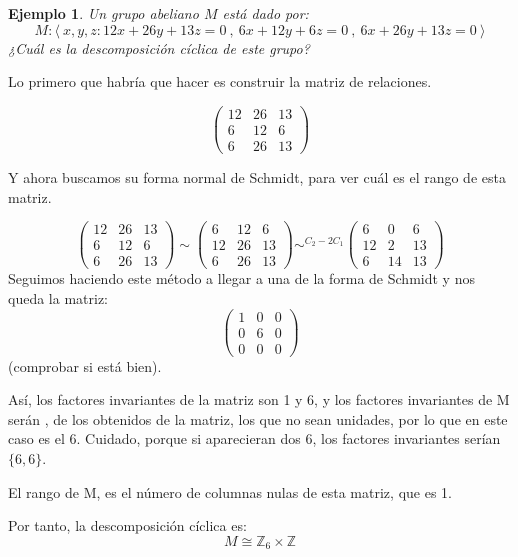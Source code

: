 \documentclass[11pt, a4paper, titlepage]{article}
\makeatletter
\newif\IfInSansMode
\let\oldsf\sffamily
\renewcommand*{\sffamily}{\oldsf\mathversion{sans}\InSansModetrue}
\let\oldnorm\normalfont
\renewcommand*{\normalfont}{\oldnorm\InSansModefalse\mathversion{normal}}
\renewenvironment{proof}[1][\proofname] {\vspace{-15pt}\par\pushQED{\qed}\normalfont\topsep6\p@\@plus6\p@\relax\trivlist\item[\hskip\labelsep\it#1\@addpunct{.}]\ignorespaces}{\popQED\endtrivlist\@endpefalse}
\providecommand{\ent}{\mathbb{Z}}
\renewenvironment{proof}[1][\proofname] {\par\pushQED{\qed}\normalfont\topsep6\p@\@plus6\p@\relax\trivlist\item[\hskip\labelsep\itshape\sffamily#1\@addpunct{.}]\ignorespaces}{\popQED\endtrivlist\@endpefalse}
\theoremstyle{theorem-style}
\theoremstyle{definition-style}
\theoremstyle{remark-style}
\theoremstyle{example-style}
\newtheorem{ejemplo}{Ejemplo}[section]
\makeatother
\begin{document}
\begin{ejemplo}
	Un grupo abeliano $M$ está dado por:
	\[
	M: \langle \ x,y,z :  12x+26y+13z = 0  \ , \ 6x+12y+6z = 0 \ , \ 6x+26y+13z = 0 \ \rangle
	\]
	¿Cuál es la descomposición cíclica de este grupo?
\end{ejemplo}
\begin{proof}[Solución]
	Lo primero que habría que hacer es construir la matriz de relaciones.

	\[
	\begin{pmatrix}
 12 & 26 & 13 \\
 6 & 12 & 6 \\
 6 & 26 & 13
\end{pmatrix}
	\]

	Y ahora buscamos su forma normal de Schmidt, para ver cuál es el rango de esta matriz.

	\[
	\begin{pmatrix}
 12 & 26 & 13 \\
 6 & 12 & 6 \\
 6 & 26 & 13
\end{pmatrix} \sim
\begin{pmatrix}
 6 & 12 & 6 \\
 12 & 26 & 13 \\
 6 & 26 & 13
\end{pmatrix} \sim^{C_2 - 2C_1}
\begin{pmatrix}
 6 & 0 & 6 \\
 12 & 2 & 13 \\
 6 & 14& 13
\end{pmatrix}
	\]
	Seguimos haciendo este método a llegar a una de la forma de Schmidt y nos queda la matriz:
	\[
	\begin{pmatrix}
 1 & 0 & 0 \\
 0 & 6 & 0 \\
 0 & 0 & 0
\end{pmatrix}
	\]
	(comprobar si está bien).

	Así, los factores invariantes de la matriz son 1 y 6, y los factores invariantes de M serán , de los obtenidos de la matriz, los que no sean unidades, por lo que en este caso es el 6. Cuidado, porque si aparecieran dos 6, los factores invariantes serían $\{6,6\}$.

	El rango de M, es el número de columnas nulas de esta matriz, que es 1.

	Por tanto, la descomposición cíclica es:
	\[
	M \cong \ent_6 \times \ent
	\]
\end{proof}
\end{document}
